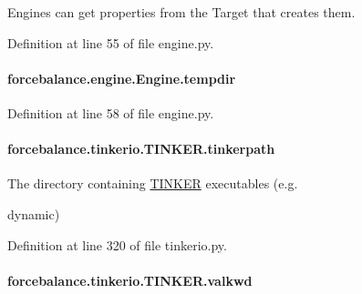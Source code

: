 Engines can get properties from the Target that creates them. 



Definition at line 55 of file engine.\-py.

\hypertarget{classforcebalance_1_1engine_1_1Engine_a7bb2deae7ee926f0df7758a92b382515}{
\paragraph[{tempdir}]{\setlength{\rightskip}{0pt plus 5cm}forcebalance.\-engine.\-Engine.\-tempdir\hspace{0.3cm}{\ttfamily [inherited]}}}\label{classforcebalance_1_1engine_1_1Engine_a7bb2deae7ee926f0df7758a92b382515}


Definition at line 58 of file engine.\-py.

\hypertarget{classforcebalance_1_1tinkerio_1_1TINKER_afff41f58d443d1a202227c75aaaf5ec4}{
\paragraph[{tinkerpath}]{\setlength{\rightskip}{0pt plus 5cm}forcebalance.\-tinkerio.\-T\-I\-N\-K\-E\-R.\-tinkerpath}}\label{classforcebalance_1_1tinkerio_1_1TINKER_afff41f58d443d1a202227c75aaaf5ec4}


The directory containing \hyperlink{classforcebalance_1_1tinkerio_1_1TINKER}{T\-I\-N\-K\-E\-R} executables (e.\-g. 

dynamic) 

Definition at line 320 of file tinkerio.\-py.

\hypertarget{classforcebalance_1_1tinkerio_1_1TINKER_ab9a4b2893724d9298a858477d31e46a5}{
\paragraph[{valkwd}]{\setlength{\rightskip}{0pt plus 5cm}forcebalance.\-tinkerio.\-T\-I\-N\-K\-E\-R.\-valkwd}}\label{classforcebalance_1_1tinkerio_1_1TINKER_ab9a4b2893724d9298a858477d31e46a5}


